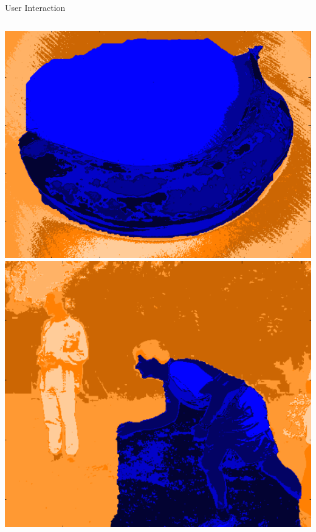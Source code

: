 \documentclass[compress,aspectratio=43]{beamer}
\begin{document}
\begin{frame}{User Interaction}
\begin{columns}[t]
{\includegraphics[width=1\linewidth]{figures/user_interaction/banana/user0_iter2.png}\\
\includegraphics[width=1\linewidth]{figures/user_interaction/bool/user0_iter2.png}
}
\end{columns}
\end{frame}
\end{document}

